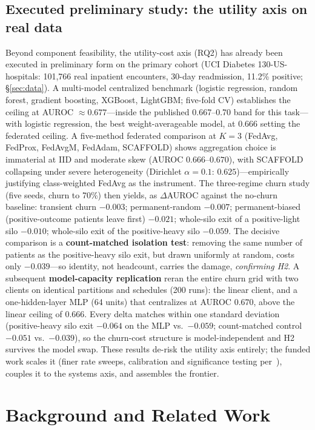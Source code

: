 \documentclass[11pt]{article}
\begin{document}
\subsection{Executed preliminary study: the utility axis on real data}
\label{sec:prelim}
Beyond component feasibility, the utility-cost axis (RQ2) has already been
executed in preliminary form on the primary cohort (UCI Diabetes
130-US-hospitals: 101{,}766 real inpatient encounters, 30-day readmission, 11.2\%
positive; \S\ref{sec:data}). A multi-model centralized benchmark (logistic
regression, random forest, gradient boosting, XGBoost, LightGBM; five-fold CV)
establishes the ceiling at AUROC $\approx 0.677$---inside the published
0.667--0.70 band for this task---with logistic regression, the best
weight-averageable model, at $0.666$ setting the federated ceiling. A five-method
federated comparison at $K{=}3$ (FedAvg, FedProx, FedAvgM, FedAdam, SCAFFOLD)
shows aggregation choice is immaterial at IID and moderate skew (AUROC
$0.666$--$0.670$), with SCAFFOLD collapsing under severe heterogeneity
(Dirichlet $\alpha{=}0.1$: $0.625$)---empirically justifying class-weighted
FedAvg as the instrument. The three-regime churn study (five seeds, churn to
70\%) then yields, as $\Delta$AUROC against the no-churn baseline: transient
churn $-0.003$; permanent-random $-0.007$; permanent-biased (positive-outcome
patients leave first) $-0.021$; whole-silo exit of a positive-light silo
$-0.010$; whole-silo exit of the positive-heavy silo $-0.059$. The decisive
comparison is a \textbf{count-matched isolation test}: removing the same number
of patients as the positive-heavy silo exit, but drawn uniformly at random,
costs only $-0.039$---so identity, not headcount, carries the damage,
\emph{confirming H2}. A subsequent \textbf{model-capacity replication} reran
the entire churn grid with two clients on identical partitions and schedules
(200 runs): the linear client, and a one-hidden-layer MLP (64 units) that
centralizes at AUROC $0.670$, above the linear ceiling of $0.666$. Every delta
matches within one standard deviation (positive-heavy silo exit $-0.064$ on the
MLP vs.\ $-0.059$; count-matched control $-0.051$ vs.\ $-0.039$), so the
churn-cost structure is model-independent and H2 survives the model swap.
These results de-risk the utility axis entirely; the funded work scales it
(finer rate sweeps, calibration and significance testing per~\cite{tennis}),
couples it to the systems axis, and assembles the frontier.

\section{Background and Related Work}
\end{document}
